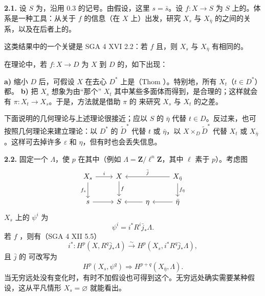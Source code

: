 \textbf{2.1.} 设 $S$ 为，沿用 0.3 的记号。由假设，这里 $s=\bar s$。设 $f:X\to S$ 为 $S$ 上的。体系是一种工具：从关于 $f$ 的信息（在 $X$ 上）出发，研究 $X_s$ 与 $X_{\bar\eta}$ 的之间的关系，以及在后者上的。

这类结果中的一个关键是 SGA 4 XVI 2.2：若 $f$ 且，则 $X_s$ 与 $X_{\bar\eta}$ 有相同的。

在理论中，若 $f:X\to D$ 为 $X$ 到 $D$ 的，如下出现：

\textbf{a)} 缩小 $D$ 后，可假设 $X$ 在去心 $D^*$ 上是（Thom ）。特别地，所有 $X_t$（$t\in D^*$）都。
\textbf{b)} 把 $X_s$ 想象为由“那个” $X_t$ 其中某些多面体而得到，是合理的；这样就会有 $\pi:X_t\to X_s$。于是，方法就是借助 $\pi$ 的 来研究 $X_s$ 与 $X_t$ 的之差。

下面说明的几何理论与上述理论很接近；应以 $S$ 的 $\bar\eta$ 代替 $t\in D$。反过来，也可按照几何理论来建立理论：以 $D^*$ 的 $\widetilde D^*$ 代替 $t$ 或 $\bar\eta$，以 $X\times_D\widetilde D^*$ 代替 $X_t$ 或 $X_{\bar\eta}$。这样可去掉许多 $\varepsilon$ 和 $\eta$，但有时也会丢失信息。

\textbf{2.2.} 固定一个 $\Lambda$，使 $p$ 在其中（例如 $\Lambda=\mathbf Z/\ell^n\mathbf Z$，其中 $\ell$ 素于 $p$）。考虑图
\[
\begin{tikzcd}
X_s\arrow[r,"i"]\arrow[d,"f_s"']&X\arrow[d,"f"]&&X_{\bar\eta}\arrow[ll,"\bar j"']\arrow[d,"f_{\bar\eta}"]\\
s\arrow[r]&S&\eta\arrow[l]&\bar\eta\arrow[l]
\end{tikzcd}
\]
$X_s$ 上的 $\psi^i$ 为
\[
\psi^i=i^*R^i\bar j_*\Lambda.\tag{2.2.1}
\]
若 $f$ ，则有（SGA 4 XII 5.5）
\[
i^*:H^p(X,R^q\bar j_*\Lambda)\xrightarrow{\sim}
H^p(X_s,i^*R^q\bar j_*\Lambda),\tag{2.2.2}
\]
且 $\bar j$ 的 可改写为
\[
H^p(X_s,\psi^q)\Longrightarrow H^{p+q}(X_{\bar\eta},\Lambda).\tag{2.2.3}
\]
当无穷远处没有变化时，有时不加假设也可得到这个。无穷远处确实需要某种假设，这从平凡情形 $X_s=\varnothing$ 就能看出。

